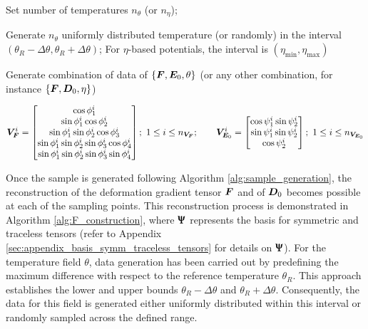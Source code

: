 \begin{algorithm}
\begin{algorithmic}[1]
\begin{algorithmic}[1]
			\State Set number of temperatures $n_{\theta}$ (or $n_{\eta}$);
			
			\State Generate $n_{\theta}$ uniformly distributed temperature (or randomly) in the interval $(\theta_R-\Delta\theta,\theta_R+\Delta\theta)$; For $\eta$-based potentials, the interval is $(\eta_{\text{min}},\eta_{\text{max}})$
		\end{algorithmic}
		
		\State Generate combination of data of $\{\boldsymbol{F},\boldsymbol{E}_0,\theta\}$ (or any other combination, for instance $\{\boldsymbol{F},\boldsymbol{D}_0,\eta\}$)
	\end{algorithmic}
	
\end{algorithm}


%


%
\begin{equation}
\label{eqn:spherical_parametersisation}
\bm{V}_{\vect{F}}^i = 
\begin{bmatrix}
\cos{\phi_1^i} \\
\sin{\phi_1^i}\cos{\phi_2^i} \\
\sin{\phi_1^i}\sin{\phi_2^i}\cos{\phi_3^i} \\
\sin{\phi_1^i}\sin{\phi_2^i}\sin{\phi_3^i}\cos{\phi_4^i} \\
\sin{\phi_1^i}\sin{\phi_2^i}\sin{\phi_3^i}\sin{\phi_4^i}
\end{bmatrix};\,\, 1\leq i\leq n_{\bm{V_F}};\qquad 
%	
\bm{V}_{\vect{E}_0}^i=\begin{bmatrix}
\cos\psi_1^i\sin\psi_2^i\\  \sin\psi_1^i\sin\psi_2^i\\  \cos\psi_2^i\end{bmatrix};\,\, 1\leq i\leq n_{\bm{V}_{\vect{E}_0}}
\end{equation} 




Once the sample is generated following Algorithm \ref{alg:sample_generation}, the reconstruction of the deformation gradient tensor $\boldsymbol{F}$ and of $\boldsymbol{D}_0$ becomes possible at each of the sampling points. This reconstruction process is demonstrated in Algorithm \ref{alg:F_construction}, where $\bm{\Uppsi}$ represents the basis for symmetric and traceless tensors (refer to Appendix \ref{sec:appendix_basis_symm_traceless_tensors} for details on $\bm{\Uppsi}$). For the temperature field $\theta$, data generation has been carried out by predefining the maximum difference with respect to the reference temperature $\theta_R$. This approach establishes the lower and upper bounds $\theta_R-\Delta\theta$ and $\theta_R+\Delta\theta$.  Consequently, the data for this field is generated either uniformly distributed within this interval or randomly sampled across the defined range.





